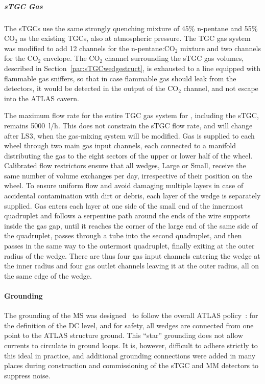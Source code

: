 \documentclass[cernpreprint, atlasdraft=false, UKenglish,british,orcidlogo, texmf, orcidlogo]{atlasdoc}
\begin{document}
\subparagraph{sTGC Gas}
The \glspl{sTGC} use the same strongly quenching mixture of 45\% n-pentane and 55\% CO$_2$ as the existing \glspl{TGC}, also at atmospheric pressure.
The \gls{TGC} gas system was modified to add \num{12} channels for the n-pentane:CO$_2$ mixture and two channels for the CO$_2$ envelope.
The CO$_2$ channel surrounding the \gls{sTGC} gas volumes, described in Section~\ref{par:sTGCwedgestruct}, is exhausted to a line equipped with flammable gas sniffers, so that in case flammable gas should leak from the detectors, it would be detected in the output of the CO$_2$ channel, and not escape into the ATLAS cavern.
 
The maximum flow rate for the entire \gls{TGC} gas system for \RunThr, including the \gls{sTGC}, remains \SI{5000}{\litre/\hour}. This does not constrain the \gls{sTGC} flow rate, and will change after \gls{LS3}, when the gas-mixing system will be modified.
Gas is supplied to each wheel through two main gas input channels, each connected to a manifold distributing the gas to the eight sectors of the upper or lower half of the wheel.
Calibrated flow restrictors ensure that all wedges, Large or Small, receive the same number of volume exchanges per day, irrespective of their position on the wheel.
To ensure uniform flow and avoid damaging multiple layers in case of accidental contamination with dirt or debris, each layer of the wedge is separately supplied.
Gas enters each layer at one side of the small end of the innermost quadruplet and follows a serpentine path around the ends of the wire supports inside the gas gap, until it reaches the corner of the large end of the same side of the quadruplet, passes through a tube into the second quadruplet, and then passes in the same way to the outermost quadruplet, finally exiting at the outer radius of the wedge. There are thus four gas input channels entering the wedge at the inner radius and four gas outlet channels leaving it at the outer radius, all on the same edge of the wedge.
 
\paragraph{Grounding}
The grounding of the \gls{MS} was designed~\cite{NSWelx} to follow the overall ATLAS policy~\cite{Blanchot:1073170}: for the definition of the DC level, and for safety, all wedges are connected from one point to the ATLAS structure ground. This ``star'' grounding does not allow currents to circulate in ground loops. It is, however, difficult to adhere strictly to this ideal in practice, and additional grounding connections were added in many places during construction and commissioning of the \gls{sTGC} and \gls{MM} detectors to suppress noise.
 
\end{document}
